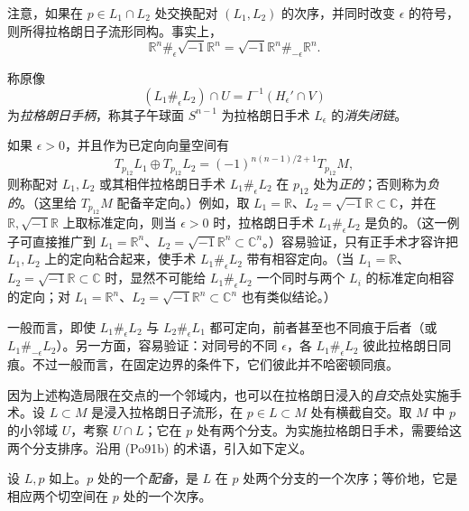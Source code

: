 注意，如果在 $p\in L_1\cap L_2$ 处交换配对 $(L_1,L_2)$ 的次序，并同时改变
$\epsilon$ 的符号，则所得拉格朗日子流形同构。事实上，
\[
 \mathbb R^n\#_\epsilon\sqrt{-1}\mathbb R^n
 =\sqrt{-1}\mathbb R^n\#_{-\epsilon}\mathbb R^n.
\]

称原像
\[
 (L_1\#_\epsilon L_2)\cap U=I^{-1}(H_\epsilon'\cap V)
\]
为\emph{拉格朗日手柄}，称其子午球面 $S^{n-1}$ 为拉格朗日手术
$L_\epsilon$ 的\emph{消失闭链}。

如果 $\epsilon>0$，并且作为已定向向量空间有
\[
 T_{p_{12}}L_1\oplus T_{p_{12}}L_2
 =(-1)^{n(n-1)/2+1}T_{p_{12}}M,
\]
则称配对 $L_1,L_2$ 或其相伴拉格朗日手术 $L_1\#_\epsilon L_2$ 在
$p_{12}$ 处为\emph{正的}；否则称为\emph{负的}。（这里给 $T_{p_{12}}M$ 配备辛定向。）例如，取
$L_1=\mathbb R$、$L_2=\sqrt{-1}\mathbb R\subset\mathbb C$，并在
$\mathbb R,\sqrt{-1}\mathbb R$ 上取标准定向，则当 $\epsilon>0$ 时，拉格朗日手术
$L_1\#_\epsilon L_2$ 是负的。（这一例子可直接推广到
$L_1=\mathbb R^n$、$L_2=\sqrt{-1}\mathbb R^n\subset\mathbb C^n$。）容易验证，只有正手术才容许把 $L_1,L_2$ 上的定向粘合起来，使手术
$L_1\#_\epsilon L_2$ 带有相容定向。（当
$L_1=\mathbb R$、$L_2=\sqrt{-1}\mathbb R\subset\mathbb C$ 时，显然不可能给
$L_1\#_\epsilon L_2$ 一个同时与两个 $L_i$ 的标准定向相容的定向；对
$L_1=\mathbb R^n$、$L_2=\sqrt{-1}\mathbb R^n\subset\mathbb C^n$ 也有类似结论。）

一般而言，即使 $L_1\#_\epsilon L_2$ 与 $L_2\#_\epsilon L_1$ 都可定向，前者甚至也不同痕于后者（或 $L_1\#_{-\epsilon}L_2$）。另一方面，容易验证：对同号的不同 $\epsilon$，各
$L_1\#_\epsilon L_2$ 彼此拉格朗日同痕。不过一般而言，在固定边界的条件下，它们彼此并不哈密顿同痕。

因为上述构造局限在交点的一个邻域内，也可以在拉格朗日浸入的\emph{自交}点处实施手术。设 $L\subset M$ 是浸入拉格朗日子流形，在
$p\in L\subset M$ 处有横截自交。取 $M$ 中 $p$ 的小邻域 $U$，考察
$U\cap L$；它在 $p$ 处有两个分支。为实施拉格朗日手术，需要给这两个分支排序。沿用 (Po91b) 的术语，引入如下定义。

\begin{definition}\label{def:surgery-equipment}
设 $L,p$ 如上。$p$ 处的一个\emph{配备}，是 $L$ 在 $p$ 处两个分支的一个次序；等价地，它是相应两个切空间在 $p$ 处的一个次序。
\end{definition}


